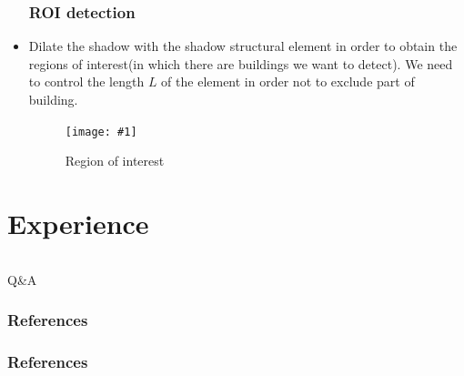 \documentclass[compress]{beamer} %
\newcommand{\insertF}[3]{
  \begin{figure}[h!]
    \centering
    \begin{minipage}{#3\linewidth}
    \texttt{[image: \#1]}
    \end{minipage}  
      \caption{#2}
  \end{figure}  
}
\begin{document}
 
\begin{frame}
\begin{itemize}
  \frametitle{ROI detection}
   \item Dilate the shadow with the shadow structural element in order to obtain the regions of interest(in which there are buildings we want to detect). We need to control the length $L$ of the element in order not to exclude part of building.
   \insertF{ROI}{Region of interest}{0.8}
  \end{itemize}
 \end{frame} 
 
 
 \section{Experience}
  \begin{frame}
   {\Huge
     \vspace {0.15\textwidth}
     \begin{columns}
       \begin{column}{0.3\textwidth}
       \end{column}
       \begin{column}{0.3\textwidth}
       \end{column}
       \begin{column}{0.3\textwidth}
       \end{column}
     \end{columns}
   }
   \vspace {0.025\textwidth}
   \begin{center}
   {\huge Q\&A}
   \end{center}
 \end{frame}

\begin{frame}\frametitle{References}
\frametitle{References}


\end{frame}
\end{document}
